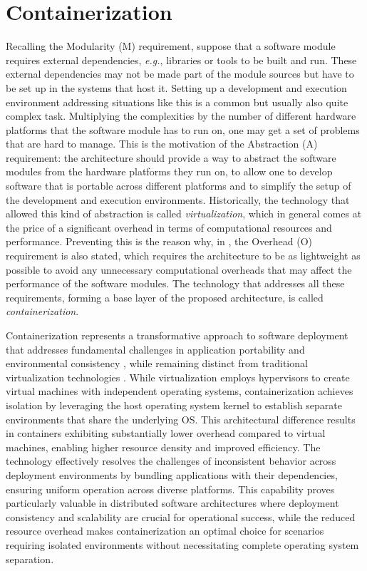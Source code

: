 \section{Containerization}
\label{sec:containerization}
Recalling the Modularity (M) requirement, suppose that a software module requires external dependencies, \emph{e.g.}, libraries or tools to be built and run. These external dependencies may not be made part of the module sources but have to be set up in the systems that host it. Setting up a development and execution environment addressing situations like this is a common but usually also quite complex task. Multiplying the complexities by the number of different hardware platforms that the software module has to run on, one may get a set of problems that are hard to manage. This is the motivation of the Abstraction (A) requirement: the architecture should provide a way to abstract the software modules from the hardware platforms they run on, to allow one to develop software that is portable across different platforms and to simplify the setup of the development and execution environments. Historically, the technology that allowed this kind of abstraction is called \emph{virtualization}, which in general comes at the price of a significant overhead in terms of computational resources and performance. Preventing this is the reason why, in , the Overhead (O) requirement is also stated, which requires the architecture to be as lightweight as possible to avoid any unnecessary computational overheads that may affect the performance of the software modules. The technology that addresses all these requirements, forming a base layer of the proposed architecture, is called \emph{containerization}.

Containerization represents a transformative approach to software deployment that addresses fundamental challenges in application portability and environmental consistency \cite{pahl_cloud_2019}, while remaining distinct from traditional virtualization technologies \cite{dua_virtualization_2014}. While virtualization employs hypervisors to create virtual machines with independent operating systems, containerization achieves isolation by leveraging the host operating system kernel to establish separate environments that share the underlying OS. This architectural difference results in containers exhibiting substantially lower overhead compared to virtual machines, enabling higher resource density and improved efficiency. The technology effectively resolves the challenges of inconsistent behavior across deployment environments by bundling applications with their dependencies, ensuring uniform operation across diverse platforms. This capability proves particularly valuable in distributed software architectures where deployment consistency and scalability are crucial for operational success, while the reduced resource overhead makes containerization an optimal choice for scenarios requiring isolated environments without necessitating complete operating system separation.


